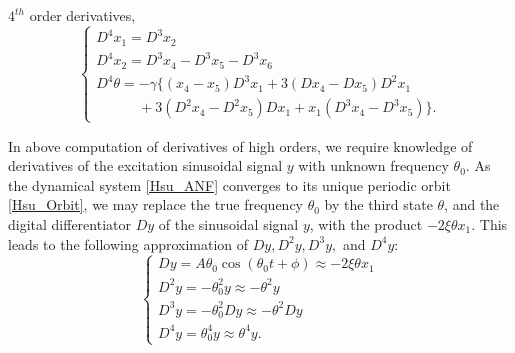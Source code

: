 \documentclass{UCF_ETD}
\begin{document}
\indent $4^{th}$ order derivatives,
\begin{equation}\label{forthderivative}
\left\{\begin{array}{l}
 D^4 x_1 = D^3 x_2  \\
D^4 x_2 = D^3 x_4 -D^3 x_5 - D^3 x_6   \\
 D^4 \theta = -\gamma  \{ (x_4- x_5)D^3 x_1 +3 (D x_4- D x_5)D^2 x_1    \\
 \qquad \quad + 3(D^2x_4- D^2x_5)D x_1 + x_1 (D^3 x_4- D^3 x_5) \}. %
\end{array}\right.\end{equation}

In  above computation of derivatives of high orders, we require  knowledge of  derivatives of the excitation sinusoidal  signal $y$ with  unknown frequency $\theta_0$.
As the dynamical system \eqref{Hsu_ANF} converges to its unique periodic orbit \eqref{Hsu_Orbit}, we may
 replace the true frequency $\theta_0$ by the third state $\theta$,
  and the
  digital differentiator $Dy$ of the sinusoidal signal $y$,
 with the product  $-2 \xi \theta x_1$. This leads to the following approximation of $Dy, D^2y, D^3y,$ and $D^4y$:
\begin{equation}\label{yderivative}
\left\{\begin{array}{l}
Dy = A\theta_0\cos(\theta_0 t + \phi) \approx -2 \xi  \theta x_1 \\
D^2y =-\theta_0^2 y\approx - {\theta}^2y \\
 D^3y =-\theta_0^2 Dy\approx  - {\theta}^2Dy \\
 D^4y = \theta_0^4y\approx {\theta}^4 y.
 \end{array}
 \right.
\end{equation}
\end{document}
